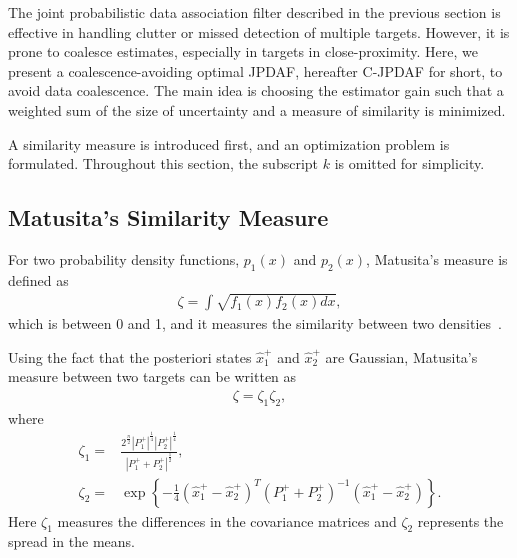 \documentclass[letterpaper, 10pt, conference]{ieeeconf}
\begin{document}
The joint probabilistic data association filter described in the previous section is effective in handling clutter or missed detection of multiple targets. However, it is prone to coalesce estimates, especially in targets in close-proximity. Here, we present a coalescence-avoiding optimal JPDAF, hereafter C-JPDAF for short, to avoid data coalescence. The main idea is choosing the estimator gain such that a weighted sum of the size of uncertainty and a measure of similarity is minimized. 

A similarity measure is introduced first, and an optimization problem is formulated. Throughout this section, the subscript $k$ is omitted for simplicity. 







	
\subsection{Matusita's Similarity Measure}

For two probability density functions, $p_1(x)$ and $p_2(x)$, Matusita's measure is defined as
\begin{align*}
\zeta = \int \sqrt{f_1(x)f_2(x) dx},
\end{align*}
which is between 0 and 1, and it measures the similarity between two densities~\cite{Coal_k}. 

Using the fact that the posteriori states $\hat x_1^+$ and $\hat x_2^+$ are Gaussian, Matusita's measure between two targets can be written as
\begin{align}
\zeta=\zeta_1\zeta_2,
\end{align}
where
\begin{align}
\label{Q}
\zeta_1=&\frac{2^\frac{n}{2}|P_1^+|^{\frac{1}{4}}|P_2^+|^{\frac{1}{4}}}{|P_1^++P_2^+|^{\frac{1}{2}}},\\
\label{R}
\zeta_2=&\exp{\left\{-\frac{1}{4}(\hat x^+_1-\hat x^+_2)^T(P_1^++P_2^+)^{-1}(\hat x^+_1-\hat x^+_2)\right\}}.
\end{align}
Here $\zeta_1$ measures the differences in the covariance matrices and $\zeta_2$ represents the spread in the means.
	
\end{document}
